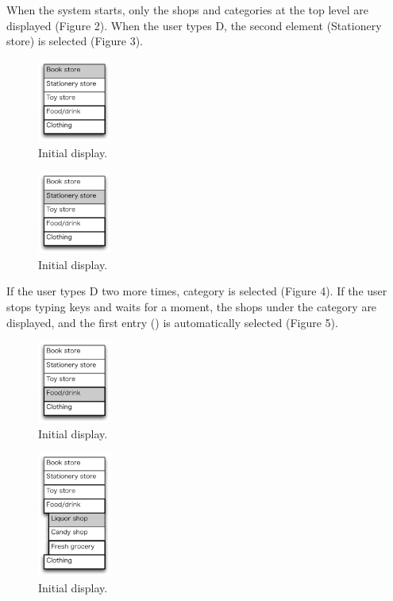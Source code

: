 \documentclass{article}
\begin{document}
When the system starts, only the shops and categories
at the top level are displayed (Figure 2).
When the user types D,
the second element (Stationery store) is selected (Figure 3).

\begin{figure}[H]
\centerline{\includegraphics[width=24mm,bb=0 0 139 157]{figures/fig2.pdf}}
\caption{Initial display.}
\label{fig2}
\end{figure}

\begin{figure}[H]
\centerline{\includegraphics[width=24mm,bb=0 0 139 157]{figures/fig3.pdf}}
\caption{Initial display.}
\label{fig3}
\end{figure}

If the user types D two more times, 
 category is selected (Figure 4).
If the user stops typing keys and waits for a moment, the shops under the 
category are displayed, and the first entry () is automatically selected (Figure 5).

\begin{figure}[H]
\centerline{\includegraphics[width=24mm,bb=0 0 139 157]{figures/fig4.pdf}}
\caption{Initial display.}
\label{fig4}
\end{figure}

\begin{figure}[H]
\centerline{\includegraphics[width=24mm,bb=0 0 139 238]{figures/fig5.pdf}}
\caption{Initial display.}
\label{fig5}
\end{figure}
\end{document}
